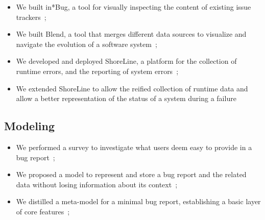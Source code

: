 \begin{itemize}

    \item We built in*Bug, a tool for visually inspecting the content of existing issue trackers~\cite{DalS2013a,DalS2014a};

    \item We built Blend, a tool that merges different data sources to visualize and navigate the evolution of a software system~\cite{DalS2015b};

    \item We developed and deployed ShoreLine, a platform for the collection of runtime errors, and the reporting of system errors~\cite{DalS2015a};

    \item We extended ShoreLine to allow the reified collection of runtime data and allow a better representation of the status of a system during a failure~\cite{DalS2017b}

\end{itemize}



\subsection{Modeling}

\begin{itemize}
    \item We performed a survey to investigate what users deem easy to provide in a bug report~\cite{DalS2016a};

    \item We proposed a model to represent and store a bug report and the related data without losing information about its context~\cite{DalS2016a};

    \item We distilled a meta-model for a minimal bug report, establishing a basic layer of core features~\cite{DalS2016a};

\end{itemize}

